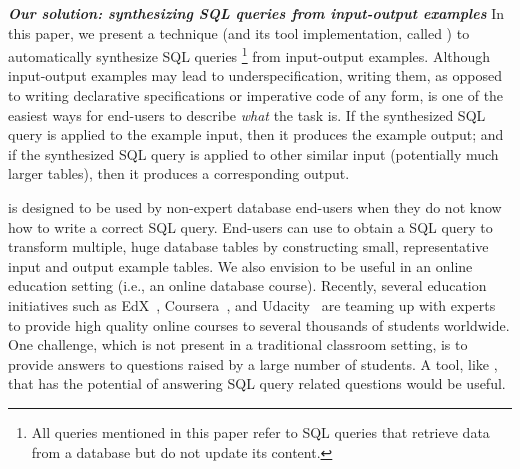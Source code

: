 

\vspace{1mm}
\noindent \textbf{\textit{Our solution: synthesizing SQL queries from input-output examples}}
In this paper, we present a technique (and its tool
implementation, called \ourtool) to automatically
synthesize SQL queries
\footnote{
All queries mentioned in this paper refer to SQL queries
that retrieve data from a database but
do not update its content.}
from input-output examples.
Although input-output examples may lead to
underspecification, writing them, as opposed to writing
declarative specifications or imperative code
of any form, is one of the easiest ways
for end-users to describe \textit{what} the task is.
If the synthesized SQL query is applied
to the example input, then it produces the example output; and if the
synthesized SQL query is applied to other
similar input (potentially much larger tables),
then it produces a corresponding output.




\ourtool is designed to be used by non-expert database
end-users when they do not know how
to write a correct SQL query. 
End-users can use \ourtool to obtain a SQL query to transform
multiple, huge database tables by constructing small, representative
input and output example tables. 
We also envision \ourtool to be useful in an online education
setting (i.e., an online database course). Recently, several
education initiatives such as EdX~\cite{edx}, Coursera~\cite{coursera},
and Udacity~\cite{udacity} are teaming up with experts to provide
high quality online courses
to several thousands of students worldwide.
One challenge, which is not present in a traditional classroom
setting, is to provide answers to questions raised by a large
number of students. A tool, like \ourtool,
that has the potential of answering SQL query related questions
would be useful.


